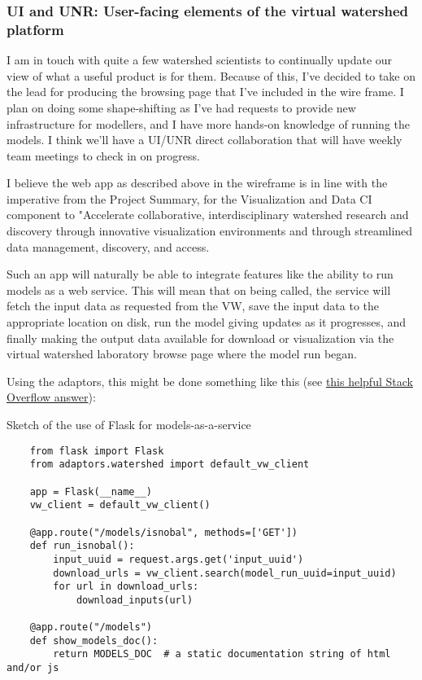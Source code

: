 \documentclass[
11pt, %
a4paper, %
oneside, %
twoside, %
headinclude,footinclude, %
BCOR5mm, %
]{scrartcl}
\begin{document}

\subsubsection{UI and UNR: User-facing elements of the virtual watershed platform} %
\label{ssub:user-facing}

I am in touch with quite a few watershed scientists to continually update our view of what
a useful product is for them. Because of this, I've decided to take on the lead for 
producing the browsing page that I've included in the wire frame. I plan on doing some 
shape-shifting as I've had requests to provide new infrastructure for modellers, and I have 
more hands-on knowledge of running the models. I think we'll have a UI/UNR 
direct collaboration that will have weekly team meetings to check in on progress.

I believe the web app as described above in the wireframe is in line with 
the imperative from the Project Summary, for the Visualization and Data CI component
to "Accelerate collaborative, interdisciplinary watershed research
and discovery through innovative visualization environments and through streamlined
data management, discovery, and access. 

Such an app will naturally be able to integrate features like the ability to run models 
as a web service. This will mean that
on being called, the service will fetch the input data as requested from the VW, save the input
data to the appropriate location on disk, run the model giving updates as it progresses, and 
finally making the output data available for download or visualization via the virtual watershed
laboratory browse page where the model run began.

Using the adaptors, this might be done something like this 
(see 
\href{http://stackoverflow.com/questions/15182696/multiple-parameters-in-in-flask-approute}{this helpful Stack Overflow answer}):

\begin{listing}
    \caption{Sketch of the use of Flask for models-as-a-service}
\begin{verbatim}
    from flask import Flask
    from adaptors.watershed import default_vw_client

    app = Flask(__name__)
    vw_client = default_vw_client()

    @app.route("/models/isnobal", methods=['GET'])
    def run_isnobal():
        input_uuid = request.args.get('input_uuid')
        download_urls = vw_client.search(model_run_uuid=input_uuid)
        for url in download_urls:
            download_inputs(url)

    @app.route("/models")
    def show_models_doc():
        return MODELS_DOC  # a static documentation string of html and/or js
\end{verbatim}
\label{lst:demo_app}
\end{listing}
\end{document}
